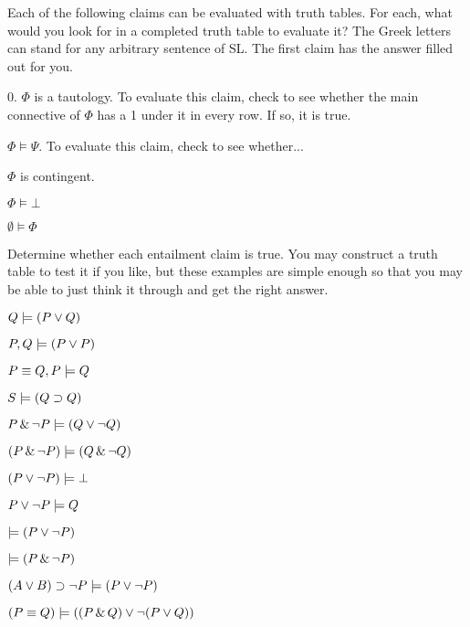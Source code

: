 \practiceproblems



\problempart
\label{HW3.C}
Each of the following claims can be evaluated with truth tables. For each, what would you look for in a completed truth table to evaluate it? The Greek letters can stand for any arbitrary sentence of SL. The first claim has the answer filled out for you.

\begin{earg}
		\item[0.] $\Phi$ is a tautology.
		To evaluate this claim, check to see whether the main connective of $\Phi$ has a 1 under it in every row. If so, it is true.
		\item $\Phi \models \Psi$. 
		To evaluate this claim, check to see whether... 
		
		\item $\Phi$ is contingent.
\item $\Phi \models \bot$
		\item $\emptyset \models \Phi$
	\end{earg}


\problempart
Determine whether each entailment claim is true. You may construct a truth table to test it if you like, but these examples are simple enough so that you may be able to just think it through and get the right answer.
\begin{earg}
\item $Q \models (P \vee Q)$
\item $P, Q \models (P \vee P)$
\item $P \equiv Q, P \models Q$ %
\item $S \models (Q \supset Q)$   %
\item $P \,\&\, \neg P \models (Q \vee \neg Q)$%
\item $(P \,\&\, \neg P) \models (Q \,\&\, \neg Q)$
\item $(P \vee \neg P) \models \bot$
\item $P \vee \neg P \models Q$%
\item $\models (P \vee \neg P)$
\item $\models (P \,\&\, \neg P)$
\item $(A \vee B) \supset \neg P \models (P \vee \neg P)$
\item $(P \equiv Q) \models ((P \,\&\, Q) \vee \neg (P \vee Q))$
\end{earg}

